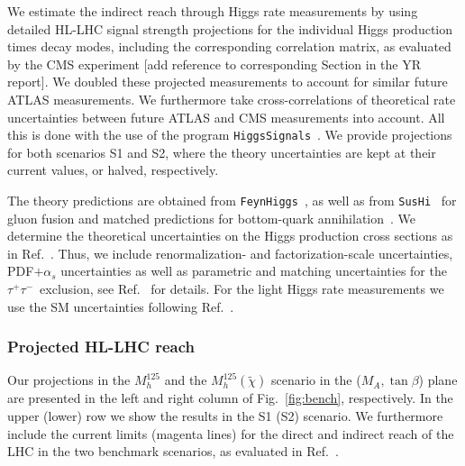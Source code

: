 \documentclass[../report.tex]{subfiles}
\begin{document}
We estimate the indirect reach through Higgs rate measurements by
using detailed HL-LHC signal strength projections for the individual
Higgs production times decay modes, including the corresponding
correlation matrix, as evaluated by the CMS experiment {\color{green}[add reference to corresponding Section in the YR report]}. We doubled
these projected measurements to account for similar future ATLAS
measurements. We furthermore take cross-correlations of theoretical
rate uncertainties between future ATLAS and CMS measurements into
account. All this is done with the use of the program
\texttt{HiggsSignals}~\cite{Bechtle:2013xfa}. 
We provide projections for both scenarios S1 and S2, where the theory uncertainties are kept at their current values, or halved,
respectively.

The theory predictions are obtained from
\texttt{FeynHiggs}~\cite{Heinemeyer:1998yj,Heinemeyer:1998np,Degrassi:2002fi,Frank:2006yh,Hahn:2013ria,Bahl:2016brp,Bahl:2017aev,FH214},
as well as from \texttt{SusHi}~\cite{Harlander:2012pb, Harlander:2016hcx,
Harlander:2005rq,Harlander:2002wh,
Harlander:2002vv,Anastasiou:2014lda,Anastasiou:2015yha,
Anastasiou:2016cez,Degrassi:2010eu, Degrassi:2011vq,
Degrassi:2012vt,Actis:2008ug}
for gluon fusion and matched predictions for bottom-quark
annihilation~\cite{Bonvini:2015pxa,Bonvini:2016fgf,Forte:2015hba, Forte:2016sja}. We determine the theoretical uncertainties on the Higgs production cross sections as in Ref.~\cite{Bahl:2018zmf}. Thus, we include renormalization- and factorization-scale uncertainties, PDF$+\alpha_s$ uncertainties as well as parametric and matching uncertainties for the $\tau^+\tau^-$~exclusion, see Ref.~\cite{Bahl:2018zmf} for details. For the light Higgs rate measurements we use the SM uncertainties following Ref.~\cite{deFlorian:2016spz}.

\subsubsection*{Projected HL-LHC reach}
 
Our projections in the $M_h^{125}$ and the $M_h^{125}(\tilde{\chi})$ scenario in the
($M_A, \tan\beta$) plane are presented in the left and right column of Fig.~\ref{fig:bench}, respectively. In the upper (lower) row we show the results in the S1 (S2) scenario. We furthermore include the current limits (magenta lines) for the direct and indirect reach of the LHC in the two benchmark scenarios, as evaluated in Ref.~\cite{Bahl:2018zmf}.
\end{document}
